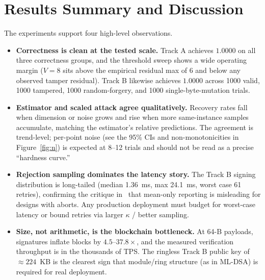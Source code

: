 \documentclass[11pt]{article}
\begin{document}
\section{Results Summary and Discussion}\label{sec:results}

The experiments support four high-level observations.

\begin{itemize}
\item \textbf{Correctness is clean at the tested scale.} Track A achieves
  $1.0000$ on all three correctness groups, and the threshold sweep shows a
  wide operating margin ($V=8$ sits above the empirical residual max of 6 and
  below any observed tamper residual).  Track B likewise achieves $1.0000$
  across 1000 valid, 1000 tampered, 1000 random-forgery, and 1000
  single-byte-mutation trials.
\item \textbf{Estimator and scaled attack agree qualitatively.} Recovery rates
  fall when dimension or noise grows and rise when more same-instance samples
  accumulate, matching the estimator's relative predictions.  The agreement is
  trend-level; per-point noise (see the 95\% CIs and non-monotonicities in
  Figure~\ref{fig:n}) is expected at 8--12 trials and should not be read as a
  precise ``hardness curve.''
\item \textbf{Rejection sampling dominates the latency story.} The Track B
  signing distribution is long-tailed (median 1.36~ms, max 24.1~ms, worst case
  61 retries), confirming the critique in~\cite{mldsa-bench-2026} that mean-only
  reporting is misleading for designs with aborts.  Any production deployment
  must budget for worst-case latency or bound retries via larger $\kappa$ /
  better sampling.
\item \textbf{Size, not arithmetic, is the blockchain bottleneck.} At 64-B
  payloads, signatures inflate blocks by $4.5$--$37.8\times$, and the measured
  verification throughput is in the thousands of TPS.  The ringless Track B
  public key of $\approx 224$~KB is the clearest sign that module/ring
  structure (as in ML-DSA) is required for real deployment.
\end{itemize}
\end{document}
